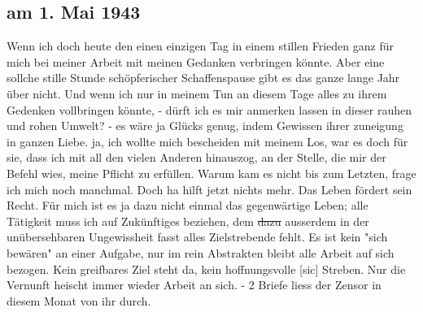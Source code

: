 \subsection{am 1. Mai 1943}

Wenn ich doch heute den einen einzigen Tag in einem stillen Frieden ganz f\"{u}r mich bei meiner Arbeit mit meinen Gedanken verbringen k\"{o}nnte.
Aber eine sollche stille Stunde sch\"{o}pferischer Schaffenspause gibt es das ganze lange Jahr \"{u}ber nicht.
Und wenn ich nur in meinem Tun an diesem Tage alles zu ihrem Gedenken vollbringen k\"{o}nnte, - d\"{u}rft ich es mir anmerken lassen in dieser rauhen und rohen Umwelt?
- es w\"{a}re ja Gl\"{u}cks genug, indem Gewissen ihrer zuneigung in ganzen Liebe.
ja, ich wollte mich bescheiden mit meinem Los, war es doch f\"{u}r sie, dass ich mit all den vielen Anderen hinauszog, an der Stelle, die mir der Befehl wies, meine Pflicht zu erf\"{u}llen.
Warum kam es nicht bis zum Letzten, frage ich mich noch manchmal.
Doch ha hilft jetzt nichts mehr.
Das Leben f\"{o}rdert sein Recht.
F\"{u}r mich ist es ja dazu nicht einmal das gegenw\"{a}rtige Leben; alle T\"{a}tigkeit muss ich auf Zuk\"{u}nftiges beziehen, dem \st{dazu} ausserdem in der un\"{u}bersehbaren Ungewissheit fasst alles Zielstrebende fehlt.
Es ist kein "sich bew\"{a}ren" an einer Aufgabe, nur im rein Abstrakten bleibt alle Arbeit auf sich bezogen.
Kein greifbares Ziel steht da, kein hoffnungsvolle{\color{red} [sic] } Streben.
Nur die Vernunft heischt immer wieder Arbeit an sich.
- 2 Briefe liess der Zensor in diesem Monat von ihr durch.

\clearpage
